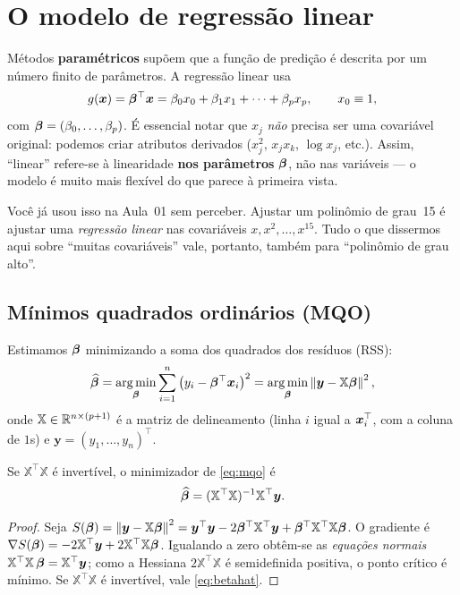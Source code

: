 \documentclass[11pt,a4paper]{article}
\begin{document}
\section{O modelo de regressão linear}
Métodos \textbf{paramétricos} supõem que a função de predição é descrita por um
número finito de parâmetros. A regressão linear usa
\begin{equation}\label{eq:linear}
  g(\bm{x}) = \bm{\beta}^\top \bm{x} = \beta_0 x_0 + \beta_1 x_1 + \dots + \beta_p x_p,
  \qquad x_0 \equiv 1,
\end{equation}
com $\bm{\beta}=(\beta_0,\dots,\beta_p)$. É essencial notar que $x_j$ \emph{não} precisa
ser uma covariável original: podemos criar atributos derivados ($x_j^2$, $x_jx_k$,
$\log x_j$, etc.). Assim, ``linear'' refere-se à linearidade \textbf{nos
parâmetros} $\bm{\beta}$, não nas variáveis --- o modelo é muito mais flexível do que
parece à primeira vista.

\begin{ideia}
Você já usou isso na Aula~01 sem perceber. Ajustar um polinômio de grau~15 é
ajustar uma \emph{regressão linear} nas covariáveis $x,x^2,\dots,x^{15}$. Tudo o que
dissermos aqui sobre ``muitas covariáveis'' vale, portanto, também para ``polinômio
de grau alto''.
\end{ideia}

\subsection{Mínimos quadrados ordinários (MQO)}
Estimamos $\bm{\beta}$ minimizando a soma dos quadrados dos resíduos (RSS):
\begin{equation}\label{eq:mqo}
  \widehat{\bbeta}
   = \argmin_{\bbeta} \sum_{i=1}^n
     \big(y_i - \bbeta^\top \x_i\big)^2
   = \argmin_{\bbeta} \norm{\bm{y} - \mathbb{X}\bbeta}^2 ,
\end{equation}
onde $\mathbb{X}\in\mathbb{R}^{n\times(p+1)}$ é a matriz de delineamento (linha $i$ igual a
$\bm{x}_i^\top$, com a coluna de $1$s) e $\bm{y}=(y_1,\dots,y_n)^\top$.

\begin{proposicao}\label{prop:normal}
Se $\mathbb{X}^\top\mathbb{X}$ é invertível, o minimizador de \eqref{eq:mqo} é
\begin{equation}\label{eq:betahat}
  \widehat{\bm{\beta}} = (\mathbb{X}^\top\mathbb{X})^{-1}\mathbb{X}^\top \bm{y}.
\end{equation}
\end{proposicao}
\begin{proof}
Seja $S(\bm{\beta})=\left\lVert \bm{y}-\mathbb{X}\bm{\beta} \right\rVert^2
=\bm{y}^\top\bm{y}-2\bm{\beta}^\top\mathbb{X}^\top\bm{y}+\bm{\beta}^\top\mathbb{X}^\top\mathbb{X}\bm{\beta}$.
O gradiente é $\nabla S(\bm{\beta})=-2\mathbb{X}^\top\bm{y}+2\mathbb{X}^\top\mathbb{X}\bm{\beta}$.
Igualando a zero obtêm-se as \emph{equações normais}
$\mathbb{X}^\top\mathbb{X}\,\bm{\beta}=\mathbb{X}^\top\bm{y}$; como a Hessiana
$2\mathbb{X}^\top\mathbb{X}$ é semidefinida positiva, o ponto crítico é mínimo. Se
$\mathbb{X}^\top\mathbb{X}$ é invertível, vale \eqref{eq:betahat}.
\end{proof}
\end{document}
